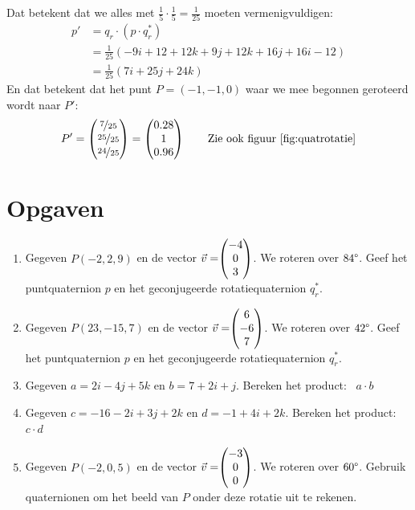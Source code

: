 Dat betekent dat we alles met $\frac{1}{5} \cdot\frac{1}{5} = \frac{1}{25}$ moeten vermenigvuldigen: 
\begin{align*}
    p' &=  q_r\cdot (p\cdot q^*_r)  \\
       &=  \frac{1}{25}(-9i + 12 +12k + 9j + 12k + 16j + 16i - 12) \\
       & = \frac{1}{25} (7i + 25j + 24k)
\end{align*}
En dat betekent dat het punt $ P=(-1,-1,0)  $ waar we mee begonnen  geroteerd wordt naar $P'$:
\[
    P'= \begin{pmatrix} \nicefrac{7}{25} \\ \nicefrac{25}{25} \\ \nicefrac{24}{25} \end{pmatrix} = \begin{pmatrix} 0.28 \\ 1 \\ 0.96 \end{pmatrix}  \qquad \text{Zie ook figuur \ref{fig:quatrotatie}}
\]


\newpage
\section{Opgaven}
\begin{enumerate}
    \setlength{\itemsep}{10pt}
	\item Gegeven $P (-2, 2, 9)$ en de vector $\vec{v} = \vecdrie{-4}{0}{3} $. 
	We roteren over $84\degree$. Geef het puntquaternion $p$ en het geconjugeerde rotatiequaternion $q_r^*$. 
 
	\item Gegeven $P (23, -15, 7)$ en de vector $\vec{v} = \vecdrie{6}{-6}{7} $. 
	We roteren over $42\degree$. Geef het puntquaternion $p$ en het geconjugeerde rotatiequaternion  $q_r^*$.
	
	\item Gegeven $a = 2i-4j+5k$ en $b = 7+2i+j$. Bereken het product: \ $a\cdot b$
 
	\item Gegeven $c = -16 -2i+3j+2k$ en $d = -1+4i+2k$. Bereken het product: \ $c\cdot d$
 
	\item Gegeven $P (-2, 0, 5)$ en de vector $\vec{v} = \vecdrie{-3}{0}{0} $. 
	We roteren over $60\degree$. Gebruik quaternionen om het beeld van $P$ onder deze rotatie uit te rekenen.
\end{enumerate}

